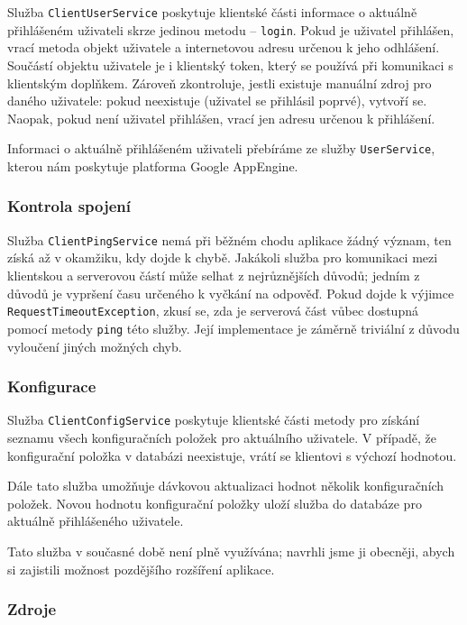 Služba \verb|ClientUserService| poskytuje klientské části informace o aktuálně přihlášeném uživateli skrze jedinou metodu -- \verb|login|.
Pokud je uživatel přihlášen, vrací metoda objekt uživatele a internetovou adresu určenou k jeho odhlášení.
Součástí objektu uživatele je i klientský token, který se používá při komunikaci s klientským doplňkem. %
Zároveň zkontroluje, jestli existuje manuální zdroj pro daného uživatele: pokud neexistuje (uživatel se přihlásil poprvé), vytvoří se.
Naopak, pokud není uživatel přihlášen, vrací jen adresu určenou k přihlášení.

Informaci o aktuálně přihlášeném uživateli přebíráme ze služby \verb|UserService|, kterou nám poskytuje platforma Google AppEngine.

\subsubsection{Kontrola spojení}

Služba \verb|ClientPingService| nemá při běžném chodu aplikace žádný význam, ten získá až v okamžiku, kdy dojde k chybě.
Jakákoli služba pro komunikaci mezi klientskou a serverovou částí může selhat z nejrůznějších důvodů; jedním z důvodů je vypršení času určeného k vyčkání na odpověď.
Pokud dojde k výjimce \verb|RequestTimeoutException|, zkusí se, zda je serverová část vůbec dostupná pomocí metody \verb|ping| této služby.
Její implementace je záměrně triviální z důvodu vyloučení jiných možných chyb.

\subsubsection{Konfigurace}

Služba \verb|ClientConfigService| poskytuje klientské části metody pro získání seznamu všech konfiguračních položek pro aktuálního uživatele.
V případě, že konfigurační položka v databázi neexistuje, vrátí se klientovi s výchozí hodnotou.

Dále tato služba umožňuje dávkovou aktualizaci hodnot několik konfiguračních položek.
Novou hodnotu konfigurační položky uloží služba do databáze pro aktuálně přihlášeného uživatele.

Tato služba v současné době není plně využívána; navrhli jsme ji obecněji, abych si zajistili možnost pozdějšího rozšíření aplikace.

\subsubsection{Zdroje}

